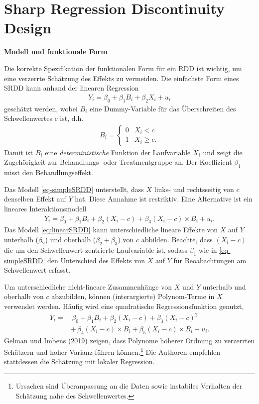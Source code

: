 \documentclass[
  a4paper,
  DIV=11,
  oneside]{scrreprt}
\begin{document}
\section{Sharp Regression Discontinuity
Design}\label{sharp-regression-discontinuity-design}

\textbf{Modell und funktionale Form}

Die korrekte Spezifikation der funktionalen Form für ein RDD ist
wichtig, um eine verzerrte Schätzung des Effekts zu vermeiden. Die
einfachste Form eines SRDD kann anhand der linearen Regression
\begin{align}
Y_i = \beta_0 + \beta_1 B_i + \beta_2 X_i + u_i\label{eq-simpleSRDD}
\end{align} geschätzt werden, wobei \(B_i\) eine Dummy-Variable für das
Überschreiten des Schwellenwertes \(c\) ist, d.h. \begin{align*}
  B_i=\begin{cases}
    0 & X_i < c\\
    1 & X_i \geq c.
  \end{cases}
\end{align*} Damit ist \(B_i\) eine \emph{deterministische} Funktion der
Laufvariable \(X_i\) und zeigt die Zugehörigkeit zur Behandlungs- oder
Treatmentgruppe an. Der Koeffizient \(\beta_1\) misst den
Behandlungseffekt.

Das Modell \eqref{eq-simpleSRDD} unterstellt, dass \(X\) links- und
rechtsseitig von \(c\) denselben Effekt auf \(Y\) hat. Diese Annahme ist
restriktiv. Eine Alternative ist ein lineares Interaktionsmodell
\begin{align}
Y_i = \beta_0 + \beta_1 B_i + \beta_2 (X_i - c) + \beta_3(X_i - c)\times B_i + u_i.\label{eq:linearSRDD}
\end{align} Das Modell \eqref{eq:linearSRDD} kann unterschiedliche
lineare Effekte von \(X\) auf \(Y\) unterhalb (\(\beta_2\)) und oberhalb
(\(\beta_2 + \beta_3\)) von \(c\) abbilden. Beachte, dass \((X_i - c)\)
die um den Schwellenwert zentrierte Laufvariable ist, sodass \(\beta_1\)
wie in \eqref{eq-simpleSRDD} den Unterschied des Effekts von \(X\) auf
\(Y\) für Beoabachtungen am Schwellenwert erfasst.

Um unterschiedliche nicht-lineare Zusammenhänge von \(X\) und \(Y\)
unterhalb und oberhalb von \(c\) abzubilden, können (interargierte)
Polynom-Terme in \(X\) verwendet werden. Häufig wird eine quadratische
Regressionsfunktion genutzt, \begin{align}
  Y_i =&\, \beta_0 + \beta_1 B_i + \beta_2 (X_i - c) + \beta_3 (X_i - c)^2\\ 
       &+\, \beta_4(X_i - c)\times B_i + \beta_5(X_i - c)\times B_i + u_i.\label{eq:quadSRDD}
\end{align} Gelman und Imbens (2019) zeigen, dass Polynome höherer
Ordnung zu verzerrten Schätzern und hoher Varianz führen
können.\footnote{Ursachen sind Überanpassung an die Daten sowie
  instabiles Verhalten der Schätzung nahe des Schwellenwertes.} Die
Authoren empfehlen stattdessen die Schätzung mit lokaler Regression.
\end{document}
